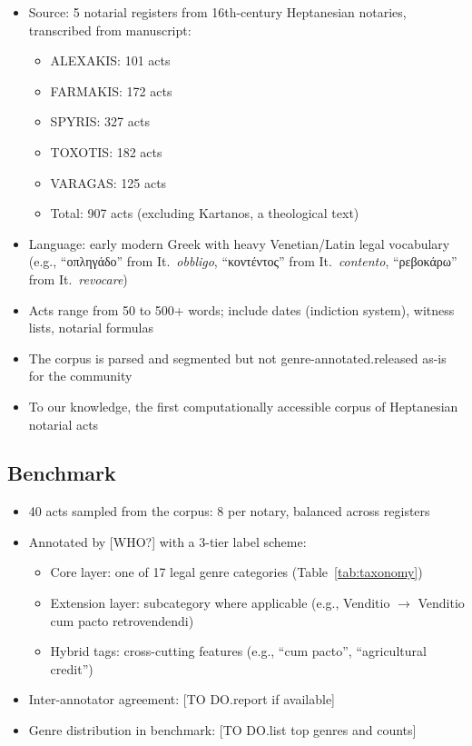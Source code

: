 \documentclass[10pt, a4paper]{article}
\begin{document}
\begin{itemize}
\item Source: 5 notarial registers from 16th-century Heptanesian notaries, transcribed from manuscript:
  \begin{itemize}
  \item ALEXAKIS: 101 acts
  \item FARMAKIS: 172 acts
  \item SPYRIS: 327 acts
  \item TOXOTIS: 182 acts
  \item VARAGAS: 125 acts
  \item Total: 907 acts (excluding Kartanos, a theological text)
  \end{itemize}
\item Language: early modern Greek with heavy Venetian/Latin legal vocabulary (e.g., ``οπληγάδο'' from It.\ \emph{obbligo}, ``κοντέντος'' from It.\ \emph{contento}, ``ρεβοκάρω'' from It.\ \emph{revocare})
\item Acts range from 50 to 500+ words; include dates (indiction system), witness lists, notarial formulas
\item The corpus is parsed and segmented but not genre-annotated.released as-is for the community
\item To our knowledge, the first computationally accessible corpus of Heptanesian notarial acts
\end{itemize}

\subsection{Benchmark}

\begin{itemize}
\item 40 acts sampled from the corpus: 8 per notary, balanced across registers
\item Annotated by [WHO?] with a 3-tier label scheme:
  \begin{itemize}
  \item Core layer: one of 17 legal genre categories (Table~\ref{tab:taxonomy})
  \item Extension layer: subcategory where applicable (e.g., Venditio $\rightarrow$ Venditio cum pacto retrovendendi)
  \item Hybrid tags: cross-cutting features (e.g., ``cum pacto'', ``agricultural credit'')
  \end{itemize}
\item Inter-annotator agreement: [TO DO.report if available]
\item Genre distribution in benchmark: [TO DO.list top genres and counts]
\end{itemize}
\end{document}
